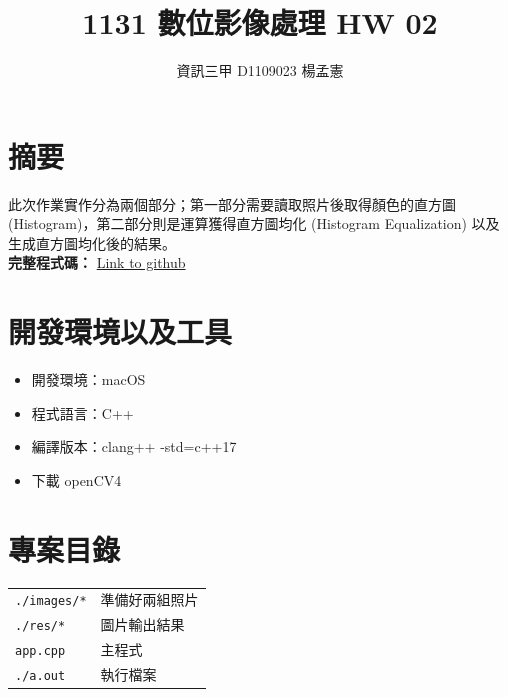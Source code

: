 \documentclass[12pt,a4paper]{article}
\begin{document}
\title{1131 數位影像處理 HW 02}
\author{資訊三甲 \quad D1109023 \quad 楊孟憲}
\date{}
\maketitle

\section*{摘要}
此次作業實作分為兩個部分；第一部分需要讀取照片後取得顏色的直方圖(Histogram)，第二部分則是運算獲得直方圖均化 (Histogram Equalization) 以及生成直方圖均化後的結果。\\[5pt]
\textbf{完整程式碼：}
\href{https://github.com/mengxian0913/FCU_Image_Process_Record/blob/master/lab02/app.cpp}{Link to github}

\section{開發環境以及工具}
    \begin{itemize}
        \item 開發環境：macOS
        \item 程式語言：C++
        \item 編譯版本：clang++ -std=c++17
        \item 下載 openCV4
    \end{itemize}

\section{專案目錄}
\begin{minipage}{\textwidth} 
    \begin{tabular}{ll}
        \texttt{./images/*} & 準備好兩組照片 \\
        \texttt{./res/*} & 圖片輸出結果 \\
        \texttt{app.cpp} & 主程式 \\
        \texttt{./a.out} & 執行檔案 \\
    \end{tabular}
\end{minipage}


\end{document}
